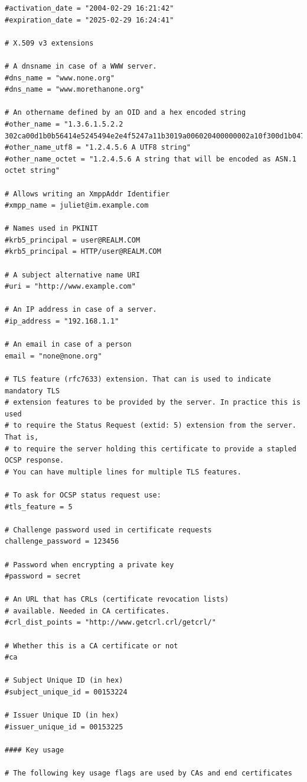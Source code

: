 \documentclass[10pt, a4paper]{report}
\begin{document}
\begin{verbatim}
#activation_date = "2004-02-29 16:21:42"
#expiration_date = "2025-02-29 16:24:41"

# X.509 v3 extensions

# A dnsname in case of a WWW server.
#dns_name = "www.none.org"
#dns_name = "www.morethanone.org"

# An othername defined by an OID and a hex encoded string
#other_name = "1.3.6.1.5.2.2 302ca00d1b0b56414e5245494e2e4f5247a11b3019a006020400000002a10f300d1b047269636b1b0561646d696e"
#other_name_utf8 = "1.2.4.5.6 A UTF8 string"
#other_name_octet = "1.2.4.5.6 A string that will be encoded as ASN.1 octet string"

# Allows writing an XmppAddr Identifier
#xmpp_name = juliet@im.example.com

# Names used in PKINIT
#krb5_principal = user@REALM.COM
#krb5_principal = HTTP/user@REALM.COM

# A subject alternative name URI
#uri = "http://www.example.com"

# An IP address in case of a server.
#ip_address = "192.168.1.1"

# An email in case of a person
email = "none@none.org"

# TLS feature (rfc7633) extension. That can is used to indicate mandatory TLS
# extension features to be provided by the server. In practice this is used
# to require the Status Request (extid: 5) extension from the server. That is,
# to require the server holding this certificate to provide a stapled OCSP response.
# You can have multiple lines for multiple TLS features.

# To ask for OCSP status request use:
#tls_feature = 5

# Challenge password used in certificate requests
challenge_password = 123456

# Password when encrypting a private key
#password = secret

# An URL that has CRLs (certificate revocation lists)
# available. Needed in CA certificates.
#crl_dist_points = "http://www.getcrl.crl/getcrl/"

# Whether this is a CA certificate or not
#ca

# Subject Unique ID (in hex)
#subject_unique_id = 00153224

# Issuer Unique ID (in hex)
#issuer_unique_id = 00153225

#### Key usage

# The following key usage flags are used by CAs and end certificates


\end{verbatim}
\end{document}
